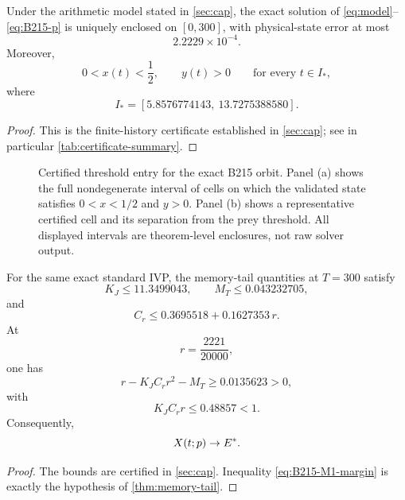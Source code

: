 \begin{proposition}
\label{prop:certified-entry}
Under the arithmetic model stated in \cref{sec:cap}, the exact solution of \eqref{eq:model}--\eqref{eq:B215-p} is uniquely enclosed on \([0,300]\), with physical-state error at most
\[
  2.2229\times10^{-4}.
\]
Moreover,
\begin{equation}
  0<x(t)<\frac12,
  \qquad
  y(t)>0
  \qquad
  \text{for every }
  t\in I_*,
  \label{eq:entry-whole-interval}
\end{equation}
where
\begin{equation}
  I_*=
  [5.8576774143,\ 13.7275388580].
  \label{eq:Istar}
\end{equation}
\end{proposition}

\begin{proof}
This is the finite-history certificate established in \cref{sec:cap}; see in particular \cref{tab:certificate-summary}.
\end{proof}

\begin{figure}[t]
  \centering
  \resizebox{\textwidth}{!}{}
  \caption{Certified threshold entry for the exact B215 orbit.  Panel (a) shows the full nondegenerate interval of cells on which the validated state satisfies \(0<x<1/2\) and \(y>0\).  Panel (b) shows a representative certified cell and its separation from the prey threshold.  All displayed intervals are theorem-level enclosures, not raw solver output.}
  \label{fig:certified-entry}
\end{figure}

\begin{proposition}
\label{prop:certified-survival}
For the same exact standard IVP, the memory-tail quantities at \(T=300\) satisfy
\[
  K_J\le11.3499043,
  \qquad
  M_T\le0.043232705,
\]
and
\[
  C_r\le0.3695518+0.1627353\,r.
\]
At
\[
  r=\frac{2221}{20000},
\]
one has
\begin{equation}
  r-K_JC_rr^2-M_T
  \ge
  0.0135623>0,
  \label{eq:B215-M1-margin}
\end{equation}
with
\[
  K_JC_rr\le0.48857<1.
\]
Consequently,
\[
  X(t;p)\to E^{*}.
\]
\end{proposition}

\begin{proof}
The bounds are certified in \cref{sec:cap}. Inequality \eqref{eq:B215-M1-margin} is exactly the hypothesis of \cref{thm:memory-tail}.
\end{proof}

